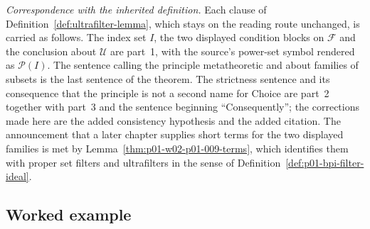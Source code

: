 \emph{Correspondence with the inherited definition.} Each clause of
Definition~\ref{def:ultrafilter-lemma}, which stays on the reading route
unchanged, is carried as follows. The index set \(I\), the two displayed
condition blocks on \(\mathcal F\) and the conclusion about \(\mathcal U\) are
part~1, with the source's power-set symbol rendered as \(\mathcal P(I)\). The
sentence calling the principle metatheoretic and about families of subsets is
the last sentence of the theorem. The strictness sentence and its consequence
that the principle is not a second name for Choice are part~2 together with
part~3 and the sentence beginning ``Consequently''; the corrections made here
are the added consistency hypothesis and the added citation. The announcement
that a later chapter supplies short terms for the two displayed families is
met by Lemma~\ref{thm:p01-w02-p01-009-terms}, which identifies them with
proper set filters and ultrafilters in the sense of
Definition~\ref{def:p01-bpi-filter-ideal}.

\subsection{Worked example}
\label{sec:p01-w02b-p01-005-example}

